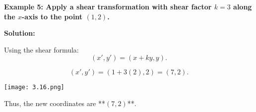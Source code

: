 \begin{flushleft}
	\textbf{Example 5: Apply a shear transformation with shear factor $k=3$ along the $x$-axis to the point $(1,2)$.}
	
	\textbf{Solution:}
	
	Using the shear formula:
	\[
	(x', y') = (x + ky, y).
	\]
	
	\[
	(x', y') = (1 + 3(2), 2) = (7,2).
	\]
	\begin{center}
		\texttt{[image: 3.16.png]}
	\end{center}
	Thus, the new coordinates are **$(7,2)$**.
\end{flushleft}

